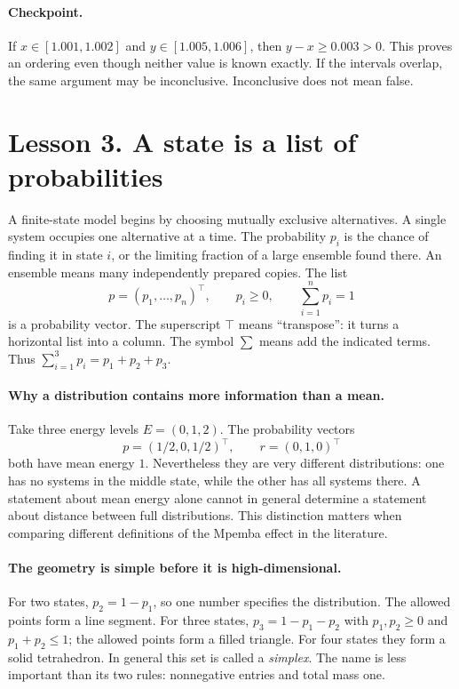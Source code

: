 \documentclass[11pt]{article}
\begin{document}
\paragraph{Checkpoint.}
If $x\in[1.001,1.002]$ and $y\in[1.005,1.006]$, then $y-x\geq0.003>0$.
This proves an ordering even though neither value is known exactly. If the
intervals overlap, the same argument may be inconclusive. Inconclusive does
not mean false.

\clearpage
\section*{Lesson 3. A state is a list of probabilities}
A finite-state model begins by choosing mutually exclusive alternatives. A
single system occupies one alternative at a time. The probability $p_i$ is the
chance of finding it in state $i$, or the limiting fraction of a large ensemble
found there. An ensemble means many independently prepared copies. The list
\[
p=(p_1,\ldots,p_n)^\top,\qquad p_i\geq0,
\qquad\sum_{i=1}^n p_i=1
\]
is a probability vector. The superscript $\top$ means ``transpose'': it turns a
horizontal list into a column. The symbol $\sum$ means add the indicated terms.
Thus $\sum_{i=1}^3p_i=p_1+p_2+p_3$.

\paragraph{Why a distribution contains more information than a mean.}
Take three energy levels $E=(0,1,2)$. The probability vectors
\[
p=(1/2,0,1/2)^\top,\qquad r=(0,1,0)^\top
\]
both have mean energy $1$. Nevertheless they are very different distributions:
one has no systems in the middle state, while the other has all systems there.
A statement about mean energy alone cannot in general determine a statement
about distance between full distributions. This distinction matters when
comparing different definitions of the Mpemba effect in the literature.

\paragraph{The geometry is simple before it is high-dimensional.}
For two states, $p_2=1-p_1$, so one number specifies the distribution. The
allowed points form a line segment. For three states, $p_3=1-p_1-p_2$ with
$p_1,p_2\geq0$ and $p_1+p_2\leq1$; the allowed points form a filled triangle.
For four states they form a solid tetrahedron. In general this set is called a
\emph{simplex}. The name is less important than its two rules: nonnegative
entries and total mass one.
\end{document}
